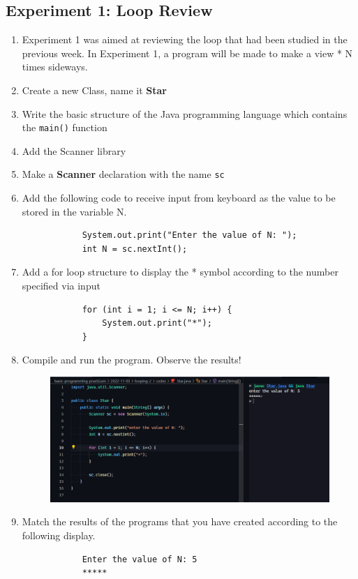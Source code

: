 \documentclass[12pt,titlepage]{article}
\begin{document}
\subsection{Experiment 1: Loop Review}
\begin{enumerate}
    \item {
        Experiment 1 was aimed at reviewing the loop that had been studied in the previous week.
        In Experiment 1, a program will be made to make a view * N times sideways.
    }
    \item Create a new Class, name it \textbf{Star}
    \item Write the basic structure of the Java programming language which contains the \texttt{main()} function
    \item Add the Scanner library
    \item Make a \textbf{Scanner} declaration with the name \texttt{sc}
    \item {
        Add the following code to receive input from keyboard as the value to be stored in the variable N.

        \begin{verbatim}
            System.out.print("Enter the value of N: ");
            int N = sc.nextInt();
        \end{verbatim}
    }
    \item {
        Add a for loop structure to display the * symbol according to the number specified via input

        \begin{verbatim}
            for (int i = 1; i <= N; i++) {
                System.out.print("*");
            }
        \end{verbatim}
    }
    \item {
        Compile and run the program. Observe the results!

        \begin{figure}[h]
            \centering
            \includegraphics[width=.8\textwidth]{./images/star.png}
        \end{figure}
    }
    \item {
        Match the results of the programs that you have created according to the following display.

        \begin{verbatim}
            Enter the value of N: 5
            *****
        \end{verbatim}
    }
\end{enumerate}
\end{document}
